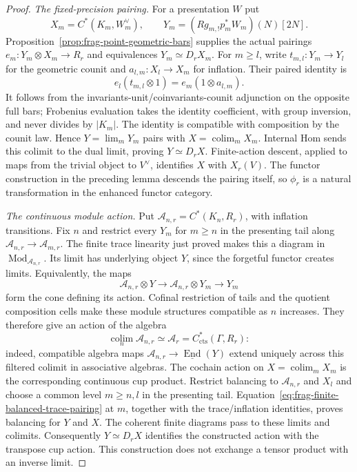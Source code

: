 \documentclass[11pt]{article}
\theoremstyle{definition}
\theoremstyle{remark}
\begin{document}
\begin{proof}
\emph{The fixed-precision pairing.}
For a presentation $W$ put
\[
 X_m=C^*(K_m,W_m^\vee),\qquad
 Y_m=(Rg_{m,!}p_m^*W_m)(N)[2N].
\]
Proposition~\ref{prop:frag-point-geometric-bars} supplies the actual
pairings $e_m:Y_m\otimes X_m\to R_r$ and equivalences $Y_m\simeq D_rX_m$.
For $m\ge l$, write $t_{m,l}:Y_m\to Y_l$ for the geometric counit
and $a_{l,m}:X_l\to X_m$ for inflation.  Their paired identity is
\[
 e_l(t_{m,l}\otimes1)=e_m(1\otimes a_{l,m}).
\]
It follows from the invariants-unit/coinvariants-counit adjunction
on the opposite full bars; Frobenius evaluation takes the identity
coefficient, with group inversion, and never divides by $|K_m|$.
The identity is compatible with composition by the counit law.
Hence $Y=\lim_mY_m$ pairs with $X=\operatorname*{colim}_mX_m$.
Internal Hom sends this colimit to the dual limit, proving $Y\simeq D_rX$.
Finite-action descent, applied to maps from the trivial object to
$V^\vee$, identifies $X$ with $X_r(V)$.  The functor construction in
the preceding lemma descends the pairing itself, so $\phi_r$ is a
natural transformation in the enhanced functor category.

\emph{The continuous module action.}
Put $\mathcal A_{n,r}=C^*(K_n,R_r)$, with inflation transitions.
Fix $n$ and restrict every $Y_m$ for $m\ge n$ in the presenting tail
along $\mathcal A_{n,r}\to\mathcal A_{m,r}$.
The finite trace linearity just proved makes this a diagram in
$\operatorname{Mod}_{\mathcal A_{n,r}}$.  Its limit has underlying
object $Y$, since the forgetful functor creates limits.  Equivalently,
the maps
\[
 \mathcal A_{n,r}\otimes Y\longrightarrow
 \mathcal A_{n,r}\otimes Y_m\longrightarrow Y_m
\]
form the cone defining its action.  Cofinal restriction of tails and
the quotient composition cells make these module structures compatible
as $n$ increases.  They therefore give an action of the algebra
\[
 \operatorname*{colim}_n\mathcal A_{n,r}
       \simeq\mathcal A_r=C^*_{\mathrm{cts}}(\Gamma,R_r):
\]
indeed, compatible algebra maps
$\mathcal A_{n,r}\to\underline{\operatorname{End}}(Y)$ extend uniquely
across this filtered colimit in associative algebras.  The cochain action on
$X=\operatorname*{colim}_mX_m$ is the corresponding continuous cup
product.  Restrict balancing to $\mathcal A_{n,r}$ and $X_l$ and
choose a common level $m\ge n,l$ in the presenting tail.
Equation~\eqref{eq:frag-finite-balanced-trace-pairing} at $m$, together
with the trace/inflation identities, proves balancing for $Y$ and $X$.
The coherent finite diagrams pass to these limits and colimits.
Consequently $Y\simeq D_rX$ identifies the constructed action with
the transpose cup action.  This construction does not exchange a
tensor product with an inverse limit.


\end{proof}
\end{document}
